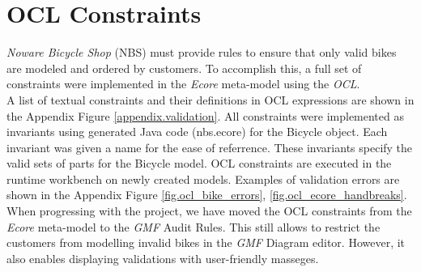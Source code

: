 \section{OCL Constraints}
\label{sec.ocl_constraints}

\noindent 
\emph{Noware Bicycle Shop} (NBS) must provide rules to ensure that
only valid bikes are modeled and ordered by customers. To accomplish this, a full
set of constraints were implemented in the \emph{Ecore} meta-model using the
\emph{OCL}.\\

\noindent
A list of textual constraints and their definitions in OCL expressions are shown
in the Appendix Figure \ref{appendix.validation}. All constraints were implemented as invariants using
generated Java code (nbs.ecore) for the Bicycle object. Each invariant was given
a name for the ease of referrence. These invariants specify the valid sets
of parts for the Bicycle model. OCL constraints are executed in the runtime
workbench on newly created models. Examples of validation errors are shown in the Appendix Figure
\ref{fig.ocl_bike_errors}, \ref{fig.ocl_ecore_handbreaks}.\\

\noindent 
When progressing with the project, we have moved the OCL constraints from the
\emph{Ecore} meta-model to the \emph{GMF} Audit Rules. This still allows to
restrict the customers from modelling invalid bikes in the \emph{GMF} Diagram
editor. However, it also enables displaying validations with user-friendly
masseges.\\


